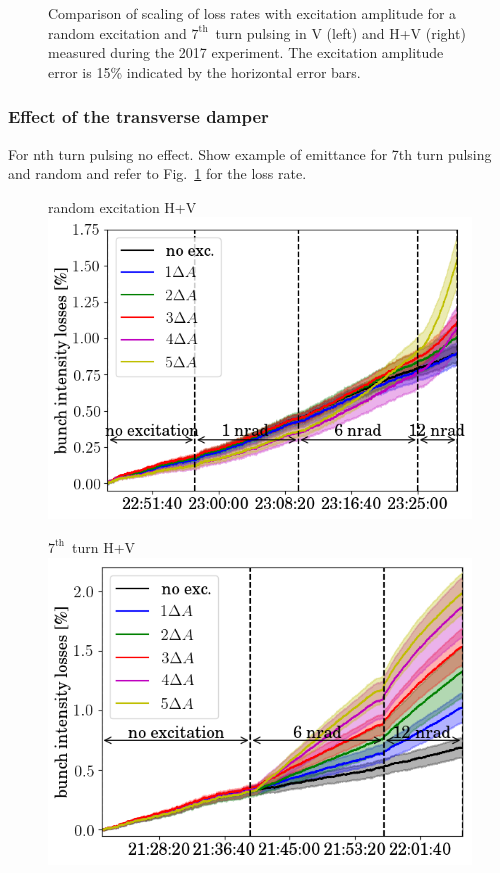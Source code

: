 \documentclass[%
 reprint,
 amsmath,amssymb,
 aps,
prstab,
]{revtex4-1}
\begin{document}
\begin{figure}[h]
\begin{minipage}[t]{0.49\linewidth}
	\end{minipage}	
	\caption{\label{fig:ranexploss}  Comparison of scaling of loss rates with excitation amplitude for a random excitation and $7^{\mathrm{th}}$~turn pulsing in V (left) and H+V (right) measured during the 2017 experiment. The excitation amplitude error is 15\% indicated by the horizontal error bars.}
\end{figure}

\subsubsection{Effect of the transverse damper\label{sec:damp}}
For nth turn pulsing no effect. Show example of emittance for 7th turn pulsing and random and refer to Fig.~\ref{fig:ranexploss} for the loss rate.
\begin{figure}[h]
	\begin{minipage}[t]{0.49\linewidth}
		\centering
		random excitation H+V
		\includegraphics[width=1.0\linewidth]{2017_bunch_intensity_hvran_no_damper_avg.png}
	\end{minipage}	
	\begin{minipage}[t]{0.49\linewidth}
		\centering
		$7^{\mathrm{th}}$~turn H+V
		\includegraphics[width=1.0\linewidth]{2017_bunch_intensity_hv7th_no_damper_avg.png}

\end{minipage}
\end{figure}
\end{document}
